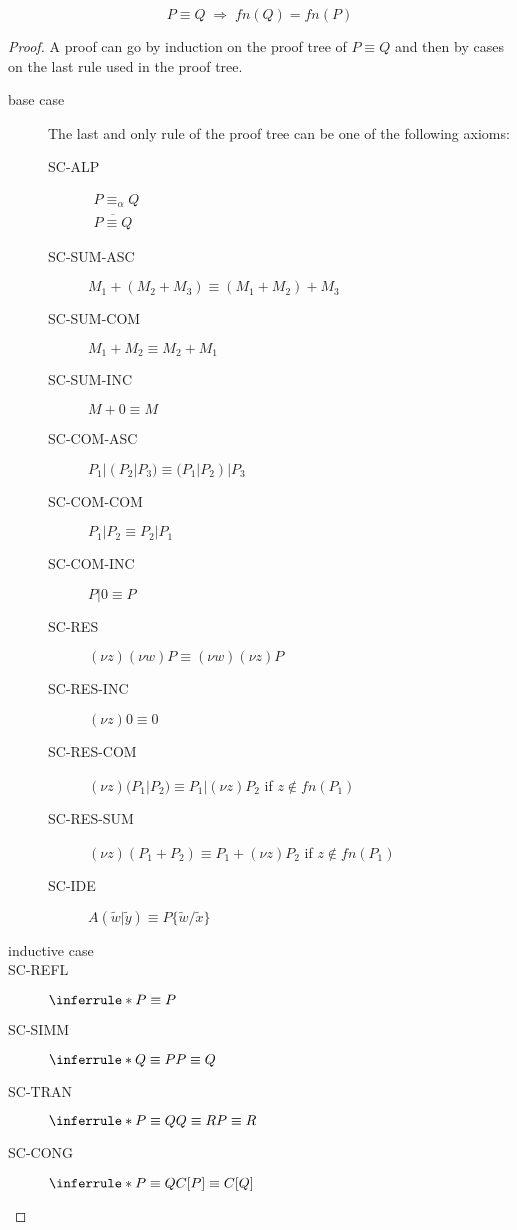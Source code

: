 \begin{lemma} %
\[
  P\equiv Q\; \Rightarrow\; fn(Q)= fn(P)
\]
  \begin{proof}
    A proof can go by induction on the proof tree of $P\equiv Q$ and then by cases on the last rule used in the proof tree. 
    \begin{description}
      \item[base case]
	The last and only rule of the proof tree can be one of the following axioms:
	\begin{description}
	  \item[SC-ALP]$\begin{array}{c}P \equiv_{\alpha} Q\\\overline{P\equiv Q}\end{array}$
	  \item[SC-SUM-ASC] $M_{1}+(M_{2}+M_{3})\equiv (M_{1}+M_{2})+M_{3}$ 
	  \item[SC-SUM-COM] $M_{1}+M_{2}\equiv M_{2}+M_{1}$ 
	  \item[SC-SUM-INC] $M+0\equiv M$
	  \item[SC-COM-ASC] $P_{1}|(P_{2}|P_{3})\equiv (P_{1}|P_{2})|P_{3}$ 
	  \item[SC-COM-COM] $P_{1}|P_{2}\equiv P_{2}|P_{1}$ 	
	  \item[SC-COM-INC] $P|0\equiv P$
	  \item[SC-RES] $(\nu z) (\nu w) P \equiv (\nu w) (\nu z) P$ 
	  \item[SC-RES-INC] $(\nu z) 0 \equiv 0$ 
	  \item[SC-RES-COM] $(\nu z) (P_{1}|P_{2}) \equiv P_{1}|(\nu z) P_{2}$ if $z\notin fn(P_{1})$
	  \item[SC-RES-SUM] $(\nu z) (P_{1}+P_{2}) \equiv P_{1}+(\nu z) P_{2}$ if $z\notin fn(P_{1})$
	  \item[SC-IDE]$A(\tilde{w}|\tilde{y})\equiv P\{\tilde{w}/\tilde{x}\}$
	\end{description}
      \item[inductive case]
	\item[SC-REFL] $\inferrule*{}{P\equiv P}$
	\item[SC-SIMM] $\inferrule*{Q\equiv P}{P\equiv Q}$
	\item[SC-TRAN] $\inferrule*{P\equiv Q \\ Q\equiv R}{P\equiv R}$
	\item[SC-CONG] $\inferrule*{P\equiv Q}{C[P]\equiv C[Q]}$
    \end{description}
  \end{proof}
\end{lemma}

